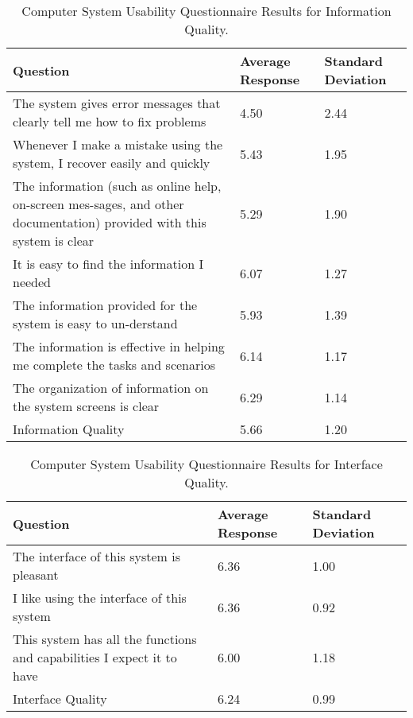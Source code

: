 \documentclass[twocolumn]{bmcart}%
\begin{document}
\begin{backmatter}
\begin{table}[h!]
\caption{Computer System Usability Questionnaire Results for Information Quality.}
      \begin{tabular}{L{3.85cm}R{1.2cm}R{1.2cm}}
      \hline
      Question & Average Response & Standard Deviation \\ \hline
      The system gives error messages that clearly tell me how to fix problems & 4.50 & 2.44 \\
      Whenever I make a mistake using the system, I recover easily and quickly & 5.43 & 1.95 \\
      The information (such as online help, on-screen mes-sages, and other documentation) provided     with this system is clear & 5.29 & 1.90 \\
      It is easy to find the information I needed & 6.07 & 1.27 \\
      The information provided for the system is easy to un-derstand &  5.93 & 1.39 \\
      The information is effective in helping me complete the tasks and scenarios & 6.14 & 1.17 \\
      The organization of information on the system screens is clear & 6.29 & 1.14 \\ \hline
      Information Quality & 5.66 & 1.20 \\ \hline
      \end{tabular}
\label{tbl:CSUQInformationQualityResults}
\end{table}

\begin{table}[h!]
\caption{Computer System Usability Questionnaire Results for Interface Quality.}
      \begin{tabular}{L{3.85cm}R{1.2cm}R{1.2cm}}
      \hline
      Question & Average Response & Standard Deviation \\ \hline
      The interface of this system is pleasant & 6.36 & 1.00 \\
      I like using the interface of this system & 6.36 & 0.92 \\
      This system has all the functions and capabilities I expect it to have & 6.00 & 1.18 \\ \hline
      Interface Quality & 6.24 & 0.99 \\ \hline
      \end{tabular}
\label{tbl:CSUQInterfaceQualityResults}
\end{table}


\end{backmatter}
\end{document}
